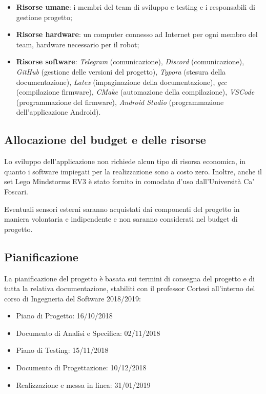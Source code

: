\documentclass{article}
\begin{document}
\begin{itemize}
\item \textbf{Risorse umane}: i membri del team di sviluppo e testing e i responsabili di gestione progetto;
\item \textbf{Risorse hardware}: un computer connesso ad Internet per ogni membro del team, hardware necessario per il robot;
\item \textbf{Risorse software}: \emph{Telegram} (comunicazione), \emph{Discord} (comunicazione), \emph{GitHub} (gestione delle versioni del progetto), \emph{Typora} (stesura della documentazione), \emph{Latex} (impaginazione della documentazione), \emph{gcc} (compilazione firmware), \emph{CMake} (automazione della compilazione), \emph{VSCode} (programmazione del firmware), \emph{Android Studio} (programmazione dell'applicazione Android).
\end{itemize}

\subsection{Allocazione del budget e delle
risorse}

Lo sviluppo dell'applicazione non richiede alcun tipo di risorsa
economica, in quanto i software impiegati per la realizzazione sono a
costo zero. Inoltre, anche il set Lego Mindstorms EV3 è stato fornito in
comodato d'uso dall'Università Ca' Foscari.

Eventuali sensori esterni saranno acquistati dai componenti del progetto
in maniera volontaria e indipendente e non saranno considerati nel
budget di progetto.

\subsection{Pianificazione}

La pianificazione del progetto è basata sui termini di consegna del
progetto e di tutta la relativa documentazione, stabiliti con il
professor Cortesi all'interno del corso di Ingegneria del Software
2018/2019:
\begin{itemize}
\item Piano di Progetto: 16/10/2018
\item Documento di Analisi e Specifica: 02/11/2018
\item Piano di Testing: 15/11/2018
\item Documento di Progettazione: 10/12/2018
\item Realizzazione e messa in linea: 31/01/2019
\end{itemize}
\end{document}
